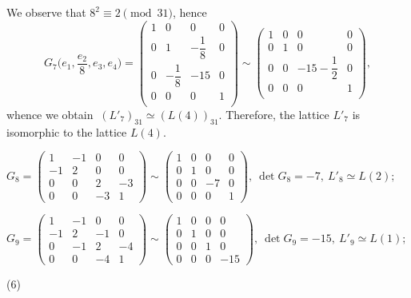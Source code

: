 \documentclass[14pt]{article}
\begin{document}
\begin{small}
We observe that $8^2  \equiv 2 \pmod{31}$,
hence
$$
G_7 \Big(e_1, \dfrac{e_2}{8}, e_3, e_4\Big) =
\begin{pmatrix}
1 & 0 & 0 & 0\\
0 & 1 & -\dfrac{1}{8} & 0\\
 0 & -\dfrac{1}{8} & -15 & 0 \\
 0 & 0 & 0 & 1\\
\end{pmatrix} \sim
\begin{pmatrix}
1 & 0 & 0 & 0\\
0 & 1 & 0 & 0 \\
0 & 0 & -15-\dfrac{1}{2} & 0 \\
0 & 0 & 0 &1 \\
\end{pmatrix},
$$
whence we obtain $\ (L'_7)_{31} \simeq (L(4))_{31}$.
Therefore, the lattice  $L'_7$ is isomorphic to the lattice $L(4)$.

\vskip 0.4cm
$
G_{8} =
\begin{pmatrix}
1 & -1 & 0 & 0\\
-1 & 2 & 0 & 0\\
0 & 0 & 2 & -3\\
0 & 0 & -3 & 1
\end{pmatrix} \sim
\begin{pmatrix}
1 & 0 & 0 & 0\\
0 & 1 & 0 & 0\\
0 & 0 & -7 & 0\\
0 & 0 & 0 & 1
\end{pmatrix}, \ \det G_8 = -7, \ L'_8 \simeq L(2);
$

\vskip 0.4cm
$
G_{9} =
\begin{pmatrix}
1 & -1 & 0 & 0\\
-1 & 2 & -1 & 0\\
0 & -1 & 2 & -4\\
0 & 0 & -4 & 1
\end{pmatrix} \sim
\begin{pmatrix}
1 & 0 & 0 & 0\\
0 & 1 & 0 & 0\\
0 & 0 & 1 & 0\\
0 & 0 & 0 & -15
\end{pmatrix}, \ \det G_{9} = -15, \ L'_{9} \simeq L(1);
$

\vskip 1cm

(6)

\vskip 1cm


\end{small}
\end{document}

